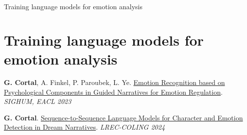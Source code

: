 \documentclass[handout,10pt]{beamer}
\begin{document}
\begin{frame}{}
\Large
\begin{center}
    Training language models for emotion analysis
    \section{Training language models for emotion analysis}
\end{center}

\vspace{1.5cm}

\footnotesize




\textbf{G. Cortal}, A. Finkel, P. Paroubek, L. Ye. \href{https://aclanthology.org/2023.latechclfl-1.8/}{Emotion Recognition based on Psychological Components in Guided Narratives for Emotion Regulation}. \textit{SIGHUM, EACL 2023}

\vspace{0.5cm}

\textbf{G. Cortal}. \href{https://aclanthology.org/2024.lrec-main.1282/}{Sequence-to-Sequence Language Models for Character and Emotion Detection in Dream Narratives}. \textit{LREC-COLING 2024}

\end{frame}
\end{document}
